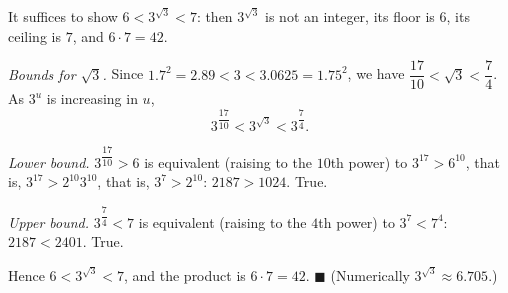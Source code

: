 It suffices to show $6<3^{\sqrt3}<7$: then $3^{\sqrt3}$ is not an integer, its floor is $6$, its ceiling is $7$, and $6\cdot7=42$.

\emph{Bounds for $\sqrt3$.} Since $1.7^2=2.89<3<3.0625=1.75^2$, we have $\dfrac{17}{10}<\sqrt3<\dfrac{7}{4}$. As $3^u$ is increasing in $u$,
\[
3^{\dfrac{17}{10}}<3^{\sqrt3}<3^{\dfrac{7}{4}} .
\]

\emph{Lower bound.} $3^{\dfrac{17}{10}}>6$ is equivalent (raising to the $10$th power) to $3^{17}>6^{10}$, that is, $3^{17}>2^{10}3^{10}$, that is, $3^7>2^{10}$: $2187>1024$. True.

\emph{Upper bound.} $3^{\dfrac{7}{4}}<7$ is equivalent (raising to the $4$th power) to $3^7<7^4$: $2187<2401$. True.

Hence $6<3^{\sqrt3}<7$, and the product is $6\cdot7=42$. $\blacksquare$ (Numerically $3^{\sqrt3}\approx6.705$.)
